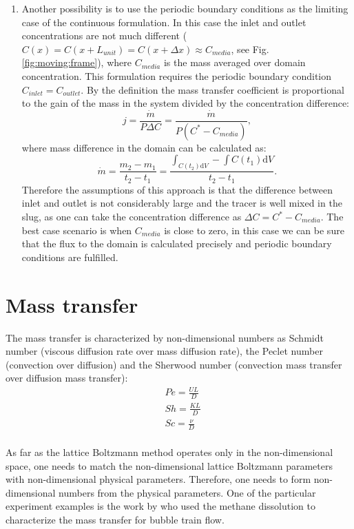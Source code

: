 \documentclass{article}
\newcommand{\beq}{\begin{equation}}
\newcommand{\feq}{\end{equation}}
\begin{document}
\begin{enumerate}
\item Another possibility is to use the periodic boundary conditions as the limiting case of the
continuous formulation. In this case the inlet and outlet concentrations are not much different
($C(x)=C(x+L_{unit})=C(x+\Delta x)\approx C_{media}$, see Fig. \ref{fig:moving:frame}), where
$C_{media}$ is the mass averaged over domain concentration. This formulation requires the periodic
boundary condition $C_{inlet}=C_{outlet}$. By the definition the mass transfer coefficient is
proportional to the gain of the mass in the system divided by the concentration difference:
\beq
j=\frac{\dot{m}}{P \Delta C}=\frac{\dot{m}}{P (C^{*}-C_{media})},
\feq
where mass difference in the domain can be calculated as:
\beq
\dot{m}=\frac{m_2-m_1}{t_2-t_1}=\frac{\int_{C(t_2)\mathrm{d}V}-\int{C(t_1)\mathrm{d}V}}{t_2-t_1}.
\feq
Therefore the assumptions  of this approach is that the difference between inlet and outlet is not
considerably large and the tracer is well mixed in the slug, as one can take the concentration
difference as $\Delta C = C^{*}-C_{media}$. The best case scenario is when $C_{media}$ is close to
zero, in this case we can be sure that the flux to the domain is calculated precisely and periodic
boundary conditions are fulfilled.
\end{enumerate}

\section{Mass transfer}
The mass transfer is characterized by non-dimensional numbers as Schmidt number (viscous diffusion
rate over mass diffusion rate), the Peclet number (convection over diffusion) and the Sherwood
number (convection mass transfer over diffusion mass transfer):
\begin{equation}
\begin{aligned}
&Pe=\frac{U L}{D}\\
&Sh=\frac{K L}{D}\\
&Sc=\frac{\nu}{D}\\
\end{aligned}
\end{equation}

As far as the lattice Boltzmann method operates only in the non-dimensional space, one needs to
match the non-dimensional lattice Boltzmann parameters with non-dimensional physical parameters.
Therefore, one needs to form non-dimensional numbers from the physical parameters. One of the
particular experiment examples is the
work by \citet{bercic-mass} who used the methane dissolution to characterize the mass transfer for
bubble train flow. 
\end{document}

